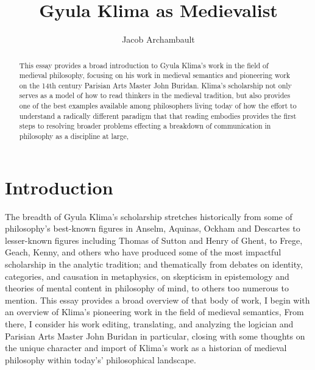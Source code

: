 \documentclass[]{article}
\title{Gyula Klima as Medievalist}
\author{Jacob Archambault}
\begin{document}
\maketitle
\begin{abstract}
This essay provides a broad introduction to Gyula Klima's work in the field of medieval philosophy, 
focusing on his work in medieval semantics 
and pioneering work on 
the 14th century Parisian Arts Master 
John Buridan. 
Klima's scholarship 
not only 
serves 
as a model 
of how to read thinkers in the medieval tradition, 
but also 
provides one of the best examples available among philosophers living today 
of how the effort to understand a radically different paradigm that that reading embodies 
provides the first steps 
to resolving broader problems effecting a breakdown of communication in philosophy as a discipline at large, 
\end{abstract}

\section{Introduction}
The breadth of Gyula Klima's scholarship stretches 
historically from some of philosophy's best-known figures in Anselm, Aquinas, Ockham and Descartes 
to lesser-known figures including Thomas of Sutton and Henry of Ghent, 
to Frege, Geach, Kenny, and others who have produced some of the most impactful scholarship in the analytic tradition; 
and 
thematically from debates 
on identity, categories, and causation in metaphysics, 
on skepticism in epistemology and theories of mental content in philosophy of mind, 
to others too numerous to mention. 
This essay provides 
a broad overview 
of that body of work, 
I begin with an overview of 
Klima's pioneering work in the field of medieval semantics, From there, I consider his work 
editing, 
translating, 
and analyzing 
the logician and Parisian Arts Master John Buridan in particular, 
closing with some thoughts on the unique character and import of Klima's work as a historian of medieval philosophy within today's' philosophical landscape. 
\end{document}
